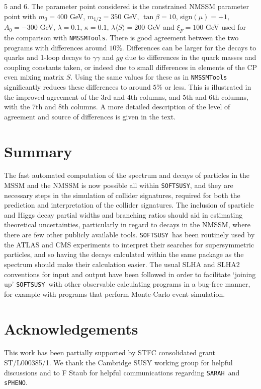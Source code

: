 \documentclass[final,3p,times,pdflatex]{elsarticle}
\def\code#1{{\tt #1}}
\begin{document}
\begin{center}
\begin{table}
{  5 and 6. The 
  parameter point considered is the
constrained NMSSM
  parameter point  with $m_0 =
  400$ GeV, $m_{1/2} = 350$ GeV, 
  $\tan\beta = 10$, sign$(\mu) = +1$, $A_0 = -300$ GeV, $\lambda = 0.1$,
  $\kappa = 
  0.1$, $\lambda \langle S \rangle = 200$ GeV and $\xi_F = 100$ GeV
used for the comparison with {\tt NMSSMTools}.
There is good agreement between the two
  programs with differences around $10\%$. Differences can be larger for the
  decays to quarks and 1-loop decays to $\gamma \gamma$ and $gg$ due to
  differences in the quark masses and coupling constants taken, or indeed due to small
  differences in elements of the CP even mixing matrix $S$. Using the same
  values for these as in {\tt NMSSMTools} significantly reduces these
  differences to around $5\%$ or less. This is illustrated in the improved
  agreement of the 3rd 
  and 4th columns, and 5th and 6th columns, with the 7th and 8th columns. A
  more detailed description of 
  the level of agreement and source of differences is given in the text.} 
\label{nmssmSLHAnoZ3Inputspctable}
\end{table}
\end{center}
       



\section{Summary} \label{sec:sum}
The fast automated computation of the spectrum and decays of particles in the
MSSM and the NMSSM is now possible all within \code{SOFTSUSY}, and they are
necessary steps in the simulation of collider signatures, required for both
the prediction and interpretation of the collider signatures. The inclusion
of sparticle and Higgs decay partial widths and branching ratios should aid in
estimating 
theoretical uncertainties, particularly in regard to decays in the NMSSM,
where there are few other publicly available tools. 
\code{SOFTSUSY}~has been routinely used by the ATLAS and CMS experiments to
interpret their searches for supersymmetric particles, and so having the
decays calculated within the same package as the spectrum should make their
calculation easier. 
The usual SLHA and SLHA2
conventions for input and output have been followed in order to facilitate
`joining up' \code{SOFTSUSY}~with other observable calculating programs in a
bug-free manner, for example with programs that perform Monte-Carlo event
simulation. 

\section*{Acknowledgements}
This work has been partially supported by STFC consolidated grant 
ST/L000385/1. We thank the Cambridge SUSY working group for helpful
discussions and to F Staub for helpful communications regarding
\code{SARAH}~and \code{sPHENO}.
\end{document}
